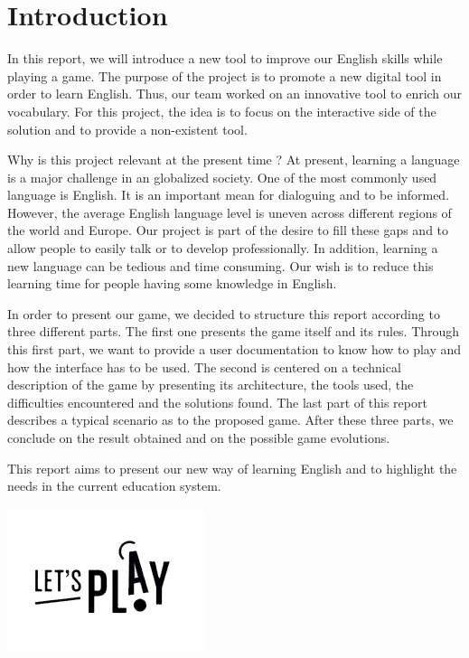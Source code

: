 \documentclass{tnreport}
\begin{document}
\maketitle

\clearpage

\renewcommand{\baselinestretch}{0.5}\normalsize
\tableofcontents
\renewcommand{\baselinestretch}{1.0}\normalsize

\clearpage

\chapter{Introduction}

In this report, we will introduce a new tool to improve our English skills while playing a game. The purpose of the project is to promote a new digital tool in order to learn English. Thus, our team worked on an innovative tool to enrich our vocabulary. For this project, the idea is to focus on the interactive side of the solution and to provide a non-existent tool. 

Why is this project relevant at the present time ? At present, learning a language is a major challenge in an globalized society. One of the most commonly used language is English. It is an important mean for dialoguing and to be informed. However, the average English language level is uneven across different regions of the world and Europe. Our project is part of the desire to fill these gaps and to allow people to easily talk or to develop professionally. In addition, learning a new language can be tedious and time consuming. Our wish is to reduce this learning time for people having some knowledge in English. 

In order to present our game, we decided to structure this report according to three different parts. The first one presents the game itself and its rules. Through this first part, we want to provide a user documentation to know how to play and how the interface has to be used. The second is centered on a technical description of the game by presenting its architecture, the tools used, the difficulties encountered and the solutions found. The last part of this report describes a typical scenario as to the proposed game. After these three parts, we conclude on the result obtained and on the possible game evolutions. 

This report aims to present our new way of learning English and to highlight the needs in the current education system. 

\begin{center}
	\includegraphics{figures/lets_play}
\end{center} 
\end{document}
